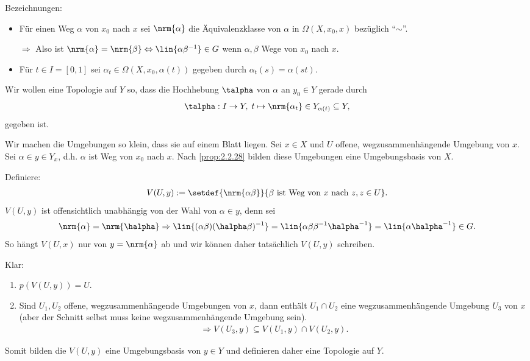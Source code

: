 Bezeichnungen:
\begin{itemize}
  \item Für einen Weg $\alpha$ von $x_0$ nach $x$ sei $\nrm{\alpha}$ die
  Äquivalenzklasse von $\alpha$ in $\Omega(X,x_0,x)$ bezüglich ``$\sim$''.
  
  $\Rightarrow$ Also ist $\nrm{\alpha} = \nrm{\beta} \Leftrightarrow
  \lin{\alpha\beta^{-1}}\in G$ wenn $\alpha,\beta$ Wege von $x_0$ nach $x$.
  \item Für $t\in I = [0,1]$ sei $\alpha_t\in \Omega(X,x_0,\alpha(t))$ gegeben
  durch $\alpha_t(s) = \alpha(st)$.
\end{itemize}
  Wir wollen eine Topologie auf $Y$ so, dass die Hochhebung $\talpha$ von
  $\alpha$ an $y_0\in Y$ gerade durch
\begin{align*}
\talpha: I\to Y,\; t\mapsto \nrm{\alpha_t} \in Y_{\alpha(t)} \subseteq Y,
\end{align*}
gegeben ist.

\begin{bemn}[Idee:]
Wir machen die Umgebungen so klein, dass sie auf einem Blatt liegen. Sei
$x\in X$ und $U$ offene, wegzusammenhängende Umgebung von $x$. Sei $\alpha\in
y\in Y_x$, d.h. $\alpha$ ist Weg von $x_0$ nach $x$. Nach \ref{prop:2.2.28}
bilden diese  Umgebungen  eine  Umgebungsbasis  von  $X$.
\end{bemn}

Definiere:
\begin{align*}
V(U,y):= \setdef{\nrm{\alpha\beta}}{\beta\text{ ist Weg von }x\text{ nach }z,
z\in U}.
\end{align*}
$V(U,y)$ ist offensichtlich unabhängig von der Wahl von $\alpha\in y$, denn sei
\begin{align*}
\nrm{\alpha} = \nrm{\halpha} \Rightarrow \lin{(\alpha\beta)(\halpha\beta)^{-1}}
= \lin{\alpha\beta\beta^{-1}\halpha^{-1}} = \lin{\alpha\halpha^{-1}} \in G.
\end{align*}
So hängt $V(U,x)$ nur von $y=\nrm{\alpha}$ ab und wir können daher tatsächlich
$V(U,y)$ schreiben.

Klar:\begin{enumerate}
       \item $p(V(U,y)) = U$.
       \item Sind $U_1,U_2$ offene, wegzusammenhängende Umgebungen von $x$,
       dann enthält $U_1\cap U_2$ eine wegzusammenhängende Umgebung $U_3$ von
       $x$ (aber der Schnitt selbst muss keine wegzusammenhängende Umgebung
       sein).
\begin{align*}
\Rightarrow V(U_3,y) \subseteq V(U_1,y)\cap V(U_2,y).
\end{align*}
\end{enumerate}
Somit bilden die $V(U,y)$ eine Umgebungsbasis von $y\in Y$ und definieren daher
eine Topologie auf $Y$.

